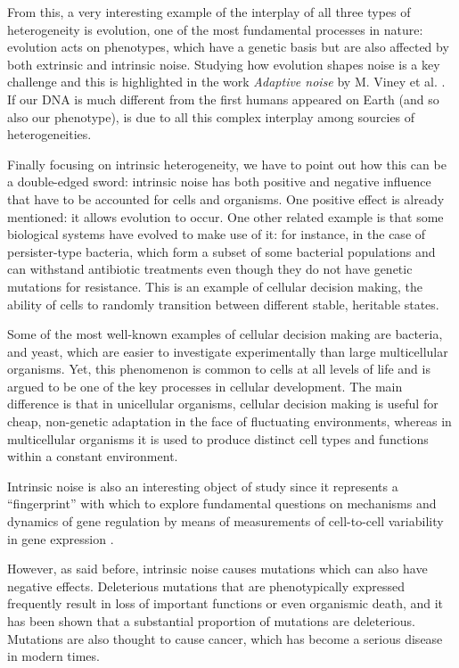 \documentclass[12pt,a4paper]{report}
\begin{document}
 From this, a very interesting example of the interplay of all three types of heterogeneity is evolution, one of the most fundamental processes in nature: evolution acts on phenotypes, which have a genetic basis but are also affected by both extrinsic and intrinsic noise. Studying how evolution shapes noise is a key challenge and this is highlighted in the work \emph{Adaptive noise} by M. Viney et al. \cite{adaptivenoise}. If our DNA is much different from the first humans appeared on Earth (and so also our phenotype), is due to all this complex interplay among sourcies of heterogeneities.
 
Finally focusing on intrinsic heterogeneity, we have to point out how this can be a double-edged sword: intrinsic noise has both positive and negative influence that have to be accounted for cells and organisms. One positive effect is already mentioned: it allows evolution to occur. One other related example is that some biological systems have evolved to make use of it: for instance, in the case of persister-type bacteria, which form a subset of some bacterial populations and can withstand antibiotic treatments even though they do not have genetic mutations for resistance. This is an example of cellular decision making, the ability of cells to randomly transition between different stable, heritable states.

Some of the most well-known examples of cellular decision making are bacteria, and yeast, which are easier to investigate experimentally than large multicellular organisms. Yet, this phenomenon is common to cells at all levels of life and is argued to be one of the key processes in cellular development. The main difference is that in unicellular organisms, cellular decision making is useful for cheap, non-genetic adaptation in the face of fluctuating environments, whereas in multicellular organisms it is used to produce distinct cell types and functions within a constant environment.

Intrinsic noise is also an interesting object of study since it represents a ``fingerprint'' with which to explore fundamental questions on mechanisms and dynamics of gene regulation by means of measurements of cell-to-cell variability in gene expression \cite{geneexpressionnoise}.

However, as said before, intrinsic noise causes mutations which can also have negative effects. Deleterious mutations that are phenotypically expressed frequently result in loss of important functions or even organismic death, and it has been shown that a substantial proportion of mutations are deleterious. Mutations are also thought to cause cancer, which has become a serious disease in modern times. %
 
\end{document}
